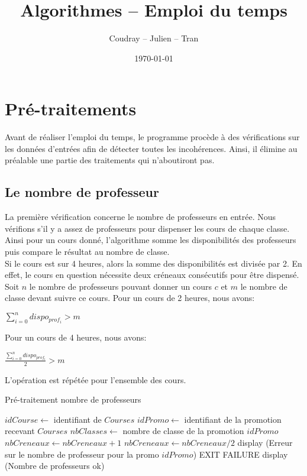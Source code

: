 \documentclass[12pt,a4paper,french]{article}
\begin{document}
\title{Algorithmes -- Emploi du temps}
\author{Coudray -- Julien -- Tran}
\date{\today}
\maketitle

\section{Pré-traitements}
Avant de réaliser l'emploi du temps, le programme procède à des vérifications sur les données d'entrées afin de détecter toutes les incohérences. Ainsi, il élimine au préalable une partie des traitements qui n'aboutiront pas.

\subsection{Le nombre de professeur}
La première vérification concerne le nombre de professeurs en entrée. Nous vérifions s'il y a assez de professeurs pour dispenser les cours de chaque classe.
Ainsi pour un cours donné, l'algorithme somme les disponibilités des professeurs puis compare le résultat au nombre de classe.\\
Si le cours est sur 4 heures, alors la somme des disponibilités est divisée par 2. En effet, le cours en question nécessite deux créneaux consécutifs pour être dispensé.\\

Soit $n$ le nombre de professeurs pouvant donner un cours $c$ et $m$ le nombre de classe devant suivre ce cours.
Pour un cours de 2 heures, nous avons:
\begin{center}
$\sum_{i=0}^n dispo_{prof_i} > m$
\end{center}

Pour un cours de 4 heures, nous avons: 
\begin{center}
$\frac{\sum_{i=0}^n dispo_{prof_i}}{2} > m$
\end{center}

L'opération est répétée pour l'ensemble des cours. 

\begin{algorithm}
\caption{Pré-traitement nombre de professeurs}
\begin{algorithmic}
\STATE $idCourse \leftarrow$ identifiant de $Courses$
\STATE $idPromo \leftarrow$ identifiant de la promotion recevant $Courses$
\STATE $nbClasses \leftarrow$ nombre de classe de la promotion $idPromo$
\STATE $nbCreneaux \leftarrow nbCreneaux + 1$
\ENDIF
\ENDFOR
\ENDIF
\ENDFOR
{}
\STATE $nbCreneaux \leftarrow nbCreneaux / 2$
\ENDIF
{}
\STATE display (Erreur sur le nombre de professeur pour la promo $idPromo$)
\STATE EXIT FAILURE
\ENDIF
\ENDFOR
\STATE display (Nombre de professeurs ok)
\end{algorithmic}
\end{algorithm}
\end{document}
